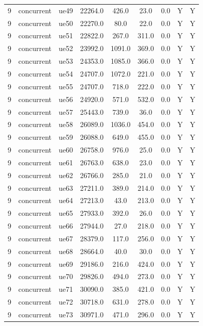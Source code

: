 \begin{table}[ht]
\begin{tabular}{|c|c|c|c|c|c|c|c|c|}
9 & concurrent & ue49 & 22264.0 & 426.0 & 23.0 & 0.0 & Y & Y \\
9 & concurrent & ue50 & 22270.0 & 80.0 & 22.0 & 0.0 & Y & Y \\
9 & concurrent & ue51 & 22822.0 & 267.0 & 311.0 & 0.0 & Y & Y \\
9 & concurrent & ue52 & 23992.0 & 1091.0 & 369.0 & 0.0 & Y & Y \\
9 & concurrent & ue53 & 24353.0 & 1085.0 & 366.0 & 0.0 & Y & Y \\
9 & concurrent & ue54 & 24707.0 & 1072.0 & 221.0 & 0.0 & Y & Y \\
9 & concurrent & ue55 & 24707.0 & 718.0 & 222.0 & 0.0 & Y & Y \\
9 & concurrent & ue56 & 24920.0 & 571.0 & 532.0 & 0.0 & Y & Y \\
9 & concurrent & ue57 & 25443.0 & 739.0 & 36.0 & 0.0 & Y & Y \\
9 & concurrent & ue58 & 26089.0 & 1036.0 & 454.0 & 0.0 & Y & Y \\
9 & concurrent & ue59 & 26088.0 & 649.0 & 455.0 & 0.0 & Y & Y \\
9 & concurrent & ue60 & 26758.0 & 976.0 & 25.0 & 0.0 & Y & Y \\
9 & concurrent & ue61 & 26763.0 & 638.0 & 23.0 & 0.0 & Y & Y \\
9 & concurrent & ue62 & 26766.0 & 285.0 & 21.0 & 0.0 & Y & Y \\
9 & concurrent & ue63 & 27211.0 & 389.0 & 214.0 & 0.0 & Y & Y \\
9 & concurrent & ue64 & 27213.0 & 43.0 & 213.0 & 0.0 & Y & Y \\
9 & concurrent & ue65 & 27933.0 & 392.0 & 26.0 & 0.0 & Y & Y \\
9 & concurrent & ue66 & 27944.0 & 27.0 & 218.0 & 0.0 & Y & Y \\
9 & concurrent & ue67 & 28379.0 & 117.0 & 256.0 & 0.0 & Y & Y \\
9 & concurrent & ue68 & 28664.0 & 40.0 & 30.0 & 0.0 & Y & Y \\
9 & concurrent & ue69 & 29186.0 & 216.0 & 424.0 & 0.0 & Y & Y \\
9 & concurrent & ue70 & 29826.0 & 494.0 & 273.0 & 0.0 & Y & Y \\
9 & concurrent & ue71 & 30090.0 & 385.0 & 421.0 & 0.0 & Y & Y \\
9 & concurrent & ue72 & 30718.0 & 631.0 & 278.0 & 0.0 & Y & Y \\
9 & concurrent & ue73 & 30971.0 & 471.0 & 296.0 & 0.0 & Y & Y \\

\end{tabular}
\end{table}
